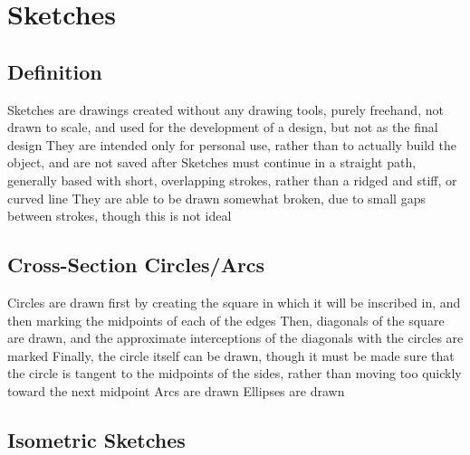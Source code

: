 \documentclass[11 pt, twoside]{article}
\newenvironment{outline*}
{
	\begin{outline}[enumerate]
	}
	{\end{outline}
}
\begin{document}
\section{Sketches}
\subsection{Definition}
\begin{outline*}
\1 Sketches are drawings created without any drawing tools, purely freehand, not drawn to scale, and used for the development of a design, but not as the final design
\2 They are intended only for personal use, rather than to actually build the object, and are not saved after
\1 Sketches must continue in a straight path, generally based with short, overlapping strokes, rather than a ridged and stiff, or curved line
\2 They are able to be drawn somewhat broken, due to small gaps between strokes, though this is not ideal
\end{outline*}
\subsection{Cross-Section Circles/Arcs}
\begin{outline*}
\1 Circles are drawn first by creating the square in which it will be inscribed in, and then marking the midpoints of each of the edges
\2 Then, diagonals of the square are drawn, and the approximate interceptions of the diagonals with the circles are marked
\2 Finally, the circle itself can be drawn, though it must be made sure that the circle is tangent to the midpoints of the sides, rather than moving too quickly toward the next midpoint
\1 Arcs are drawn
\1 Ellipses are drawn
\end{outline*}
\subsection{Isometric Sketches}
\begin{outline*}

\end{outline*}
\end{document}
